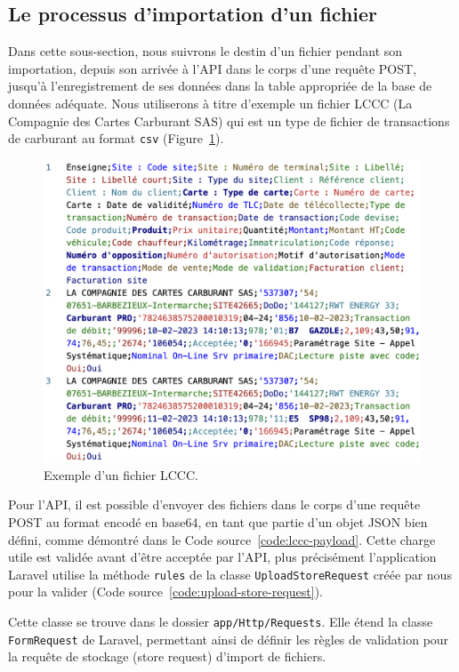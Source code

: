 \subsection{Le processus d'importation d'un fichier}\label{subsec:file-import-process}

Dans cette sous-section, nous suivrons le destin d'un fichier pendant son importation, depuis son arrivée à l'API dans le corps d'une requête POST, jusqu'à l'enregistrement de ses données dans la table appropriée de la base de données adéquate. Nous utiliserons à titre d'exemple un fichier LCCC (La Compagnie des Cartes Carburant SAS) qui est un type de fichier de transactions de carburant au format \Verb|csv| (Figure~\ref{fig:lccc}).

\begin{figure}[ht]
    \centering
    \includegraphics[width=\textwidth]{img/lccc-csv}
    \caption{Exemple d'un fichier LCCC.}
    \label{fig:lccc}
\end{figure}

Pour l'API, il est possible d'envoyer des fichiers dans le corps d'une requête POST au format encodé en base64, en tant que partie d'un objet JSON bien défini, comme démontré dans le Code source~\ref{code:lccc-payload}. Cette charge utile est validée avant d'être acceptée par l'API, plus précisément l'application Laravel utilise la méthode \Verb|rules| de la classe \Verb|UploadStoreRequest| créée par nous pour la valider (Code source~\ref{code:upload-store-request}).

Cette classe se trouve dans le dossier \Verb|app/Http/Requests|. Elle étend la classe \Verb|FormRequest| de Laravel, permettant ainsi de définir les règles de validation pour la requête de stockage (store request) d'import de fichiers.

